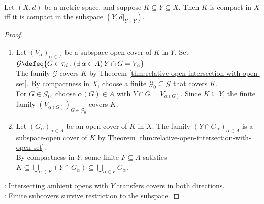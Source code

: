 \begin{theorem} \label{thm:compactness-independent-of-ambient-space} \\
Let $(X,d)$ be a metric space, and suppose $K\subseteq Y\subseteq X$. Then $K$ is compact in $X$ iff it is compact in the subspace $(Y,d|_{Y\times Y})$.
\begin{proof}
\begin{enumerate}[label=\roman*.]
\setlength{\itemsep}{0pt}
\item[$(\Rightarrow)$] Let $(V_\alpha)_{\alpha\in A}$ be a subspace-open cover of $K$ in $Y$. Set $\mathcal{G}\defeq\{G\in\tau_d:(\exists\,\alpha\in A)\,Y\cap G=V_\alpha\}$.\\
The family $\mathcal{G}$ covers $K$ by Theorem \ref{thm:relative-open-intersection-with-open-set}. By compactness in $X$, choose a finite $\mathcal{G}_0\subseteq\mathcal{G}$ that covers $K$.\\
For $G\in\mathcal{G}_0$, choose $\alpha(G)\in A$ with $Y\cap G=V_{\alpha(G)}$. Since $K\subseteq Y$, the finite family $(V_{\alpha(G)})_{G\in\mathcal{G}_0}$ covers $K$.
\item[$(\Leftarrow)$] Let $(G_\alpha)_{\alpha\in A}$ be an open cover of $K$ in $X$. The family $(Y\cap G_\alpha)_{\alpha\in A}$ is a subspace-open cover of $K$ by Theorem \ref{thm:relative-open-intersection-with-open-set}.\\
By compactness in $Y$, some finite $F\subseteq A$ satisfies $K\subseteq\bigcup\limits_{\alpha\in F}(Y\cap G_\alpha)\subseteq\bigcup\limits_{\alpha\in F}G_\alpha$.
\end{enumerate}
: Intersecting ambient opens with $Y$ transfers covers in both directions.\\
: Finite subcovers survive restriction to the subspace.
\end{proof}
\end{theorem}

